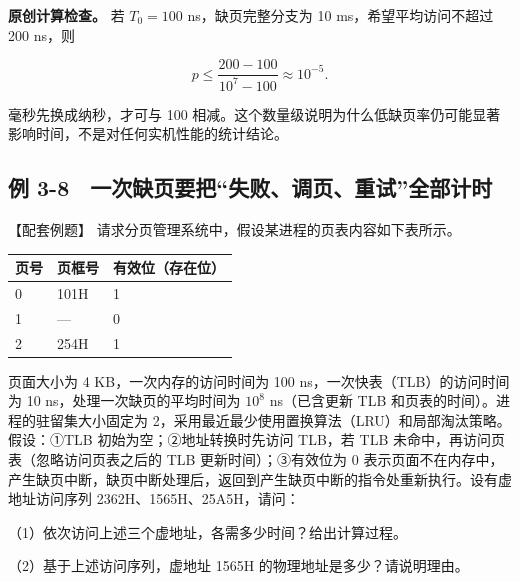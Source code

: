 \textbf{原创计算检查。} 若 \(T_0=100\) ns，缺页完整分支为 10 ms，希望平均访问不超过 200 ns，则

\[p\le\frac{200-100}{10^7-100}\approx10^{-5}.\]

毫秒先换成纳秒，才可与 100 相减。这个数量级说明为什么低缺页率仍可能显著影响时间，不是对任何实机性能的统计结论。

\subsection{例 3-8　一次缺页要把``失败、调页、重试''全部计时}\label{OS03-ex5-8}

\begin{example}[配套例题]

【配套例题】 请求分页管理系统中，假设某进程的页表内容如下表所示。

\begin{wideblock}

\par\medskip\noindent\begin{minipage}{\linewidth}\fontsize{9.3}{12}\selectfont\begin{tabularx}{\linewidth}{@{}YYY@{}}
\toprule\noalign{}
页号 & 页框号 & 有效位（存在位） \\
\midrule\noalign{}


0 & 101H & 1 \\
1 & --- & 0 \\
2 & 254H & 1 \\
\bottomrule\end{tabularx}
\end{minipage}\par\medskip

\end{wideblock}

页面大小为 4 KB，一次内存的访问时间为 100 ns，一次快表（TLB）的访问时间为 10 ns，处理一次缺页的平均时间为 \(10^8\) ns（已含更新 TLB 和页表的时间）。进程的驻留集大小固定为 2，采用最近最少使用置换算法（LRU）和局部淘汰策略。假设：{\SNsymbolfont ①}TLB 初始为空；{\SNsymbolfont ②}地址转换时先访问 TLB，若 TLB 未命中，再访问页表（忽略访问页表之后的 TLB 更新时间）；{\SNsymbolfont ③}有效位为 0 表示页面不在内存中，产生缺页中断，缺页中断处理后，返回到产生缺页中断的指令处重新执行。设有虚地址访问序列 2362H、1565H、25A5H，请问：

（1）依次访问上述三个虚地址，各需多少时间？给出计算过程。

（2）基于上述访问序列，虚地址 1565H 的物理地址是多少？请说明理由。

\end{example}


